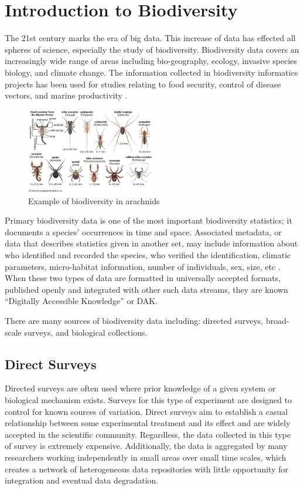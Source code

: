 \section{Introduction to Biodiversity}

The 21st century marks the era of big data. This increase of data has effected all spheres of science, especially the study of biodiversity.
Biodiversity data covers an increasingly wide range of areas including bio-geography, ecology, invasive species biology, and climate change.
The information collected in biodiversity informatics projects has been used for studies relating to food security, control of disease vectors, and marine productivity \cite{Barve}.  
\begin{figure}[htbp!] 
   \centering
   \includegraphics[width=0.5\textwidth]{pictures/biodiversity/spiders.jpg} 
   \caption{Example of biodiversity in arachnids}
   \label{fig:arachnids}
\end{figure}

Primary biodiversity data is one of the most important biodiversity statistics; it documents a species' occurrences in time and space.
Associated metadata, or data that describes statistics given in another set, may include information about who identified and recorded the species, who verified the identification, climatic parameters, micro-habitat information, number of individuals, sex, size, etc \cite{Barve}.
When these two types of data are formatted in universally accepted formats, published openly and integrated with other such data streams, they are known “Digitally Accessible Knowledge” or DAK.

There are many sources of biodiversity data including: directed surveys, broad-scale surveys, and biological collections. 

\subsection{Direct Surveys}

Directed surveys are often used where prior knowledge of a given system or biological mechanism exists.
Surveys for this type of experiment are designed to control for known sources of variation\cite {GBIF}.
Direct surveys aim to establish a casual relationship between some experimental treatment and its effect and are widely accepted in the scientific community.
Regardless, the data collected in this type of survey is extremely expensive.
Additionally, the data is aggregated by many researchers working independently in small areas over small time scales, which creates a network of heterogeneous data repositories with little opportunity for integration and eventual data degradation.

